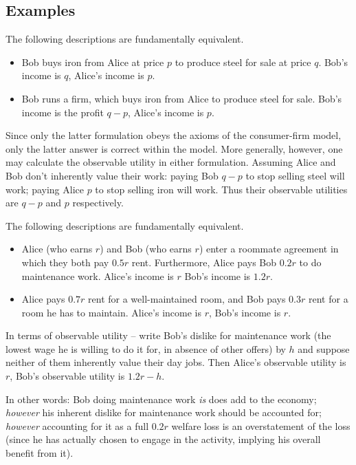 \documentclass[smallextended]{svjour3}
\begin{document}
\subsection{Examples}
\label{sec:eg}

\begin{example}
    \label{eg:1}
    The following descriptions are fundamentally equivalent.
    \begin{itemize}
        \item Bob buys iron from Alice at price $p$ to produce steel for sale at price $q$. Bob's income is $q$, Alice's income is $p$.
        \item Bob runs a firm, which buys iron from Alice to produce steel for sale. Bob's income is the profit $q-p$, Alice's income is $p$.
    \end{itemize}
    Since only the latter formulation obeys the axioms of the consumer-firm model, only the latter answer is correct within the model. More generally, however, one may calculate the observable utility in either formulation. Assuming Alice and Bob don't inherently value their work: paying Bob $q-p$ to stop selling steel will work; paying Alice $p$ to stop selling iron will work. Thus their observable utilities are $q-p$ and $p$ respectively.
\end{example}

\begin{example}
    \label{eg:2}
    The following descriptions are fundamentally equivalent.
    \begin{itemize}
        \item Alice (who earns $r$) and Bob (who earns $r$) enter a roommate agreement in which they both pay $0.5r$ rent. Furthermore, Alice pays Bob $0.2r$ to do maintenance work. Alice's income is $r$ Bob's income is $1.2r$.
        \item Alice pays $0.7r$ rent for a well-maintained room, and Bob pays $0.3r$ rent for a room he has to maintain. Alice's income is $r$, Bob's income is $r$.
    \end{itemize}
    In terms of observable utility -- write Bob's dislike for maintenance work (the lowest wage he is willing to do it for, in absence of other offers) by $h$ and suppose neither of them inherently value their day jobs. Then Alice's observable utility is $r$, Bob's observable utility is $1.2r-h$.
    
    In other words: Bob doing maintenance work \emph{is} does add to the economy; \emph{however} his inherent dislike for maintenance work should be accounted for; \emph{however} accounting for it as a full $0.2r$ welfare loss is an overstatement of the loss (since he has actually chosen to engage in the activity, implying his overall benefit from it).
\end{example}
\end{document}
